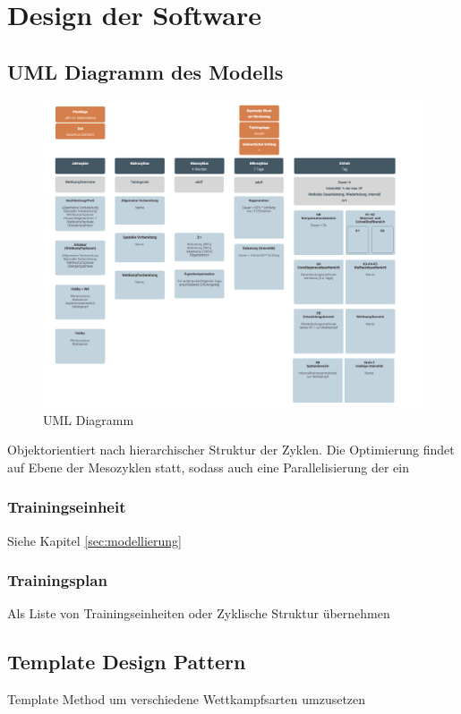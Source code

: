 \chapter{Design der Software}
\label{sec:design}

\section{UML Diagramm des Modells}
\label{sec:design:UML}
\begin{figure}[htb]
	\includegraphics[width=\textwidth]{gfx/uml.png}
	\caption{UML Diagramm}
	\label{fig:system:example1}
\end{figure}
Objektorientiert nach hierarchischer Struktur der Zyklen.
Die Optimierung findet auf Ebene der Mesozyklen statt, sodass auch eine Parallelisierung der ein
\subsection{Trainingseinheit}
    Siehe Kapitel \ref{sec:modellierung}
\subsection{Trainingsplan}
    Als Liste von Trainingseinheiten oder Zyklische Struktur übernehmen
 
\section{Template Design Pattern}
\label{sec:design:template}
Template Method um verschiedene Wettkampfsarten umzusetzen


